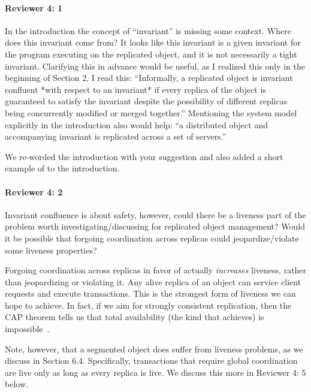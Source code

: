 \documentclass[9pt]{article}
\begin{document}
\begin{multicols*}{2}
\paragraph{Reviewer 4: 1}
\begin{feedback}
  In the introduction the concept of ``invariant'' is missing some context. Where
  does this invariant come from? It looks like this invariant is a given
  invariant for the program executing on the replicated object, and it is not
  necessarily a tight invariant.  Clarifying this in advance would be useful,
  as I realized this only in the beginning of Section 2, I read this:
  ``Informally, a replicated object is invariant confluent *with respect to an
  invariant* if every replica of the object is guaranteed to satisfy the
  invariant despite the possibility of different replicas being concurrently
  modified or merged together.'' Mentioning the system model explicitly in the
  introduction also would help: ``a distributed object and accompanying
  invariant is replicated across a set of servers.''
\end{feedback}
We re-worded the introduction with your suggestion and also added a short
example of \invariantconfluence{} to the introduction.

\paragraph{Reviewer 4: 2}
\begin{feedback}
  Invariant confluence is about safety, however, could there be a liveness part
  of the problem worth investigating/discussing for replicated object
  management? Would it be possible that forgoing coordination across replicas
  could jeopardize/violate some liveness properties?
\end{feedback}
Forgoing coordination across replicas in favor of \invariantconfluence{}
actually \emph{increases} liveness, rather than jeopardizing or violating it.
Any alive replica of an \invariantconfluent{} object can service client
requests and execute transactions. This is the strongest form of liveness we
can hope to achieve. In fact, if we aim for strongly consistent replication,
then the CAP theorem tells us that total availability (the kind that
\invariantconfluence{} achieves) is impossible~\cite{brewer2012cap,
gilbert2002brewer}.

Note, however, that a segmented \invariantconfluent{} object does suffer from
liveness problems, as we discuss in Section 6.4. Specifically, transactions
that require global coordination are live only as long as every replica is
live. We discuss this more in Reviewer 4: 5 below.


\end{multicols*}
\end{document}
